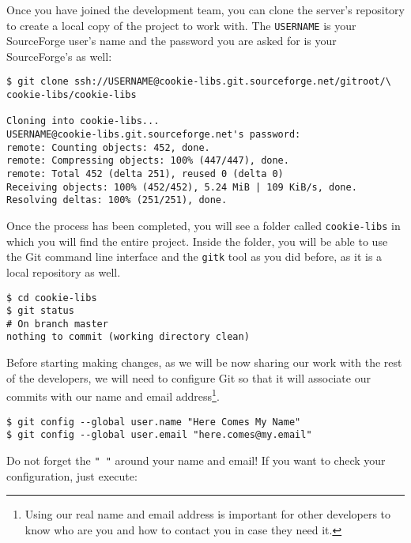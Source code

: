 \documentclass[a4paper,10pt]{article}
\newenvironment{terminal}
  {
    \vspace{+10pt}
    \begin{center}
    \begin{minipage}{0.95\textwidth}
    \begin{framed}
  }
  {
    \end{framed}
    \end{minipage}
    \end{center}
    \vspace{+10pt}
  }
\begin{document}
Once you have joined the development team, you can clone the server's
repository to create a local copy of the project to work with. The
\texttt{USERNAME} is your SourceForge user's name and the
password you are asked for is your SourceForge's as well:

\begin{terminal}
\begin{verbatim}
$ git clone ssh://USERNAME@cookie-libs.git.sourceforge.net/gitroot/\
cookie-libs/cookie-libs

Cloning into cookie-libs...
USERNAME@cookie-libs.git.sourceforge.net's password:
remote: Counting objects: 452, done.
remote: Compressing objects: 100% (447/447), done.
remote: Total 452 (delta 251), reused 0 (delta 0)
Receiving objects: 100% (452/452), 5.24 MiB | 109 KiB/s, done.
Resolving deltas: 100% (251/251), done.
\end{verbatim}
\end{terminal}

Once the process has been completed, you will see a folder called
\texttt{cookie-libs} in which you will find the entire project. Inside
the folder, you will be able to use the Git command line interface and
the \texttt{gitk} tool as you did before, as it is a local repository
as well.

\begin{terminal}
\begin{verbatim}
$ cd cookie-libs
$ git status
# On branch master
nothing to commit (working directory clean)
\end{verbatim}
\end{terminal}

Before starting making changes, as we will be now sharing our work with
the rest of the developers, we will need to configure Git so that it will
associate our commits with our name and email address\footnote{Using
our real name and email address is important for other developers to
know who are you and how to contact you in case they need it.}.

\begin{terminal}
\begin{verbatim}
$ git config --global user.name "Here Comes My Name"
$ git config --global user.email "here.comes@my.email"
\end{verbatim}
\end{terminal}

Do not forget the \texttt{" "} around your name and email! If you want
to check your configuration, just execute:
\end{document}
